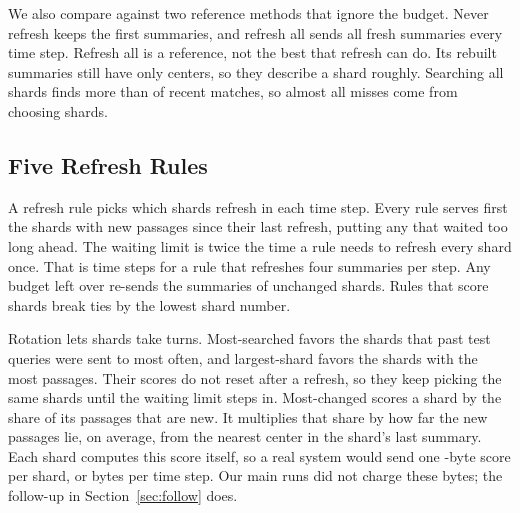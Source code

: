 We also compare against two reference methods that ignore the budget.
Never refresh keeps the first summaries, and refresh all sends all \RNumNumShards{} fresh summaries every time step.
Refresh all is a reference, not the best that refresh can do.
Its rebuilt summaries still have only \RNumCentersPerSummary{} centers, so they describe a shard roughly.
Searching all \RNumNumShards{} shards finds more than \RNumPlainAllShardsMinPct{} of recent matches, so almost all misses come from choosing shards.

\subsection{Five Refresh Rules}
\label{sec:rules}

A refresh rule picks which shards refresh in each time step.
Every rule serves first the shards with new passages since their last refresh, putting any that waited too long ahead.
The waiting limit is twice the time a rule needs to refresh every shard once.
That is \RNumPlainCapBFour{} time steps for a rule that refreshes four summaries per step.
Any budget left over re-sends the summaries of unchanged shards.
Rules that score shards break ties by the lowest shard number.

Rotation lets shards take turns.
Most-searched favors the shards that past test queries were sent to most often, and largest-shard favors the shards with the most passages.
Their scores do not reset after a refresh, so they keep picking the same shards until the waiting limit steps in.
Most-changed scores a shard by the share of its passages that are new.
It multiplies that share by how far the new passages lie, on average, from the nearest center in the shard's last summary.
Each shard computes this score itself, so a real system would send one \RNumScoreBytesPerShard{}-byte score per shard, or \RNumDCScoreEpochBytes{} bytes per time step.
Our main runs did not charge these bytes; the follow-up in Section~\ref{sec:follow} does.

